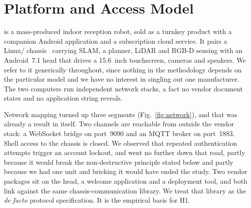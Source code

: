
\section{Platform and Access Model}
\label{sec:access}

\Platform{} is a mass-produced indoor reception robot, sold as a turnkey product with a
companion Android application and a subscription cloud service. It pairs a Linux/\ros{}
chassis~\cite{quigley2009ros} carrying SLAM, a planner, LiDAR and RGB-D sensing with an
Android~7.1 head that drives a \SI{15.6}{inch} touchscreen, cameras and speakers. We refer to it
generically throughout, since nothing in the methodology depends on the particular model and we
have no interest in singling out one manufacturer. The two computers run independent network
stacks, a fact no vendor document states and no application string reveals.



Network mapping turned up three segments (Fig.~\ref{fig:network}), and that was already a
result in itself. Two channels are reachable from outside the vendor stack: a WebSocket bridge
on port~9090 and an MQTT broker on port~1883. Shell access to the chassis is closed. We observed
that repeated authentication attempts trigger an account lockout, and went no further down that
road, partly because it would break the non-destructive principle stated below and partly
because we had one unit and bricking it would have ended the study. Two vendor packages sit on
the head, a welcome application and a deployment tool, and both link against the same
chassis-communication library. We treat that library as the \emph{de facto} protocol
specification. It is the empirical basis for H1.
